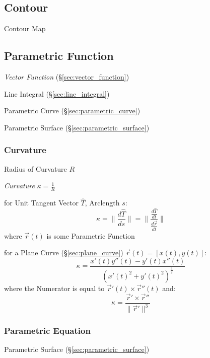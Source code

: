 \subsection{Contour}\label{sec:contour}

Contour Map



\subsection{Parametric Function}\label{sec:parametric_function}

\fist \emph{Vector Function} (\S\ref{sec:vector_function})

Line Integral (\S\ref{sec:line_integral})

\fist Parametric Curve (\S\ref{sec:parametric_curve})

\fist Parametric Surface (\S\ref{sec:parametric_surface})



\subsubsection{Curvature}\label{sec:curvature}

Radius of Curvature $R$

\emph{Curvature} $\kappa = \frac{1}{R}$

for Unit Tangent Vector $\hat{T}$, Arclength $s$:
\[
  \kappa = \|\frac{d\hat{T}}{ds}\|
    = \|\frac{\frac{d\hat{T}}{dt}}{\frac{d\vec{r}}{dt}}\|
\]
where $\vec{r}(t)$ is some Parametric Function

for a Plane Curve (\S\ref{sec:plane_curve}) $\vec{r}(t) = [x(t),y(t)]$:
\[
  \kappa = \frac{x'(t)y''(t) - y'(t)x''(t)} {(x'(t)^2 + y'(t)^2)^{\frac{3}{2}}}
\]
where the Numerator is equal to $\vec{r}'(t) \times \vec{r}''(t)$ and:
\[
  \kappa = \frac{\vec{r}' \times \vec{r}''}{\|\vec{r}'\|^3}
\]



\subsubsection{Parametric Equation}\label{sec:parametric_equation}

\fist Parametric Surface (\S\ref{sec:parametric_surface})



